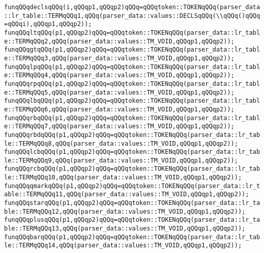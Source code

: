 \verb|funqQQqdeclsqQQq(i,qQQqp1,qQQqp2)qQQq=qQQqtoken::TOKENqQQq(parser_data::lr_table::TERMqQQq1,qQQq(parser_data::values::DECLSqQQq(\\qQQq()qQQq=qQQqi),qQQqp1,qQQqp2));|\newline
\verb|funqQQqltqQQq(p1,qQQqp2)qQQq=qQQqtoken::TOKENqQQq(parser_data::lr_table::TERMqQQq2,qQQq(parser_data::values::TM_VOID,qQQqp1,qQQqp2));|\newline
\verb|funqQQqgtqQQq(p1,qQQqp2)qQQq=qQQqtoken::TOKENqQQq(parser_data::lr_table::TERMqQQq3,qQQq(parser_data::values::TM_VOID,qQQqp1,qQQqp2));|\newline
\verb|funqQQqlpqQQq(p1,qQQqp2)qQQq=qQQqtoken::TOKENqQQq(parser_data::lr_table::TERMqQQq4,qQQq(parser_data::values::TM_VOID,qQQqp1,qQQqp2));|\newline
\verb|funqQQqrpqQQq(p1,qQQqp2)qQQq=qQQqtoken::TOKENqQQq(parser_data::lr_table::TERMqQQq5,qQQq(parser_data::values::TM_VOID,qQQqp1,qQQqp2));|\newline
\verb|funqQQqlbqQQq(p1,qQQqp2)qQQq=qQQqtoken::TOKENqQQq(parser_data::lr_table::TERMqQQq6,qQQq(parser_data::values::TM_VOID,qQQqp1,qQQqp2));|\newline
\verb|funqQQqrbqQQq(p1,qQQqp2)qQQq=qQQqtoken::TOKENqQQq(parser_data::lr_table::TERMqQQq7,qQQq(parser_data::values::TM_VOID,qQQqp1,qQQqp2));|\newline
\verb|funqQQqrbdqQQq(p1,qQQqp2)qQQq=qQQqtoken::TOKENqQQq(parser_data::lr_table::TERMqQQq8,qQQq(parser_data::values::TM_VOID,qQQqp1,qQQqp2));|\newline
\verb|funqQQqlcbqQQq(p1,qQQqp2)qQQq=qQQqtoken::TOKENqQQq(parser_data::lr_table::TERMqQQq9,qQQq(parser_data::values::TM_VOID,qQQqp1,qQQqp2));|\newline
\verb|funqQQqrcbqQQq(p1,qQQqp2)qQQq=qQQqtoken::TOKENqQQq(parser_data::lr_table::TERMqQQq10,qQQq(parser_data::values::TM_VOID,qQQqp1,qQQqp2));|\newline
\verb|funqQQqqmarkqQQq(p1,qQQqp2)qQQq=qQQqtoken::TOKENqQQq(parser_data::lr_table::TERMqQQq11,qQQq(parser_data::values::TM_VOID,qQQqp1,qQQqp2));|\newline
\verb|funqQQqstarqQQq(p1,qQQqp2)qQQq=qQQqtoken::TOKENqQQq(parser_data::lr_table::TERMqQQq12,qQQq(parser_data::values::TM_VOID,qQQqp1,qQQqp2));|\newline
\verb|funqQQqplusqQQq(p1,qQQqp2)qQQq=qQQqtoken::TOKENqQQq(parser_data::lr_table::TERMqQQq13,qQQq(parser_data::values::TM_VOID,qQQqp1,qQQqp2));|\newline
\verb|funqQQqbarqQQq(p1,qQQqp2)qQQq=qQQqtoken::TOKENqQQq(parser_data::lr_table::TERMqQQq14,qQQq(parser_data::values::TM_VOID,qQQqp1,qQQqp2));|\newline
